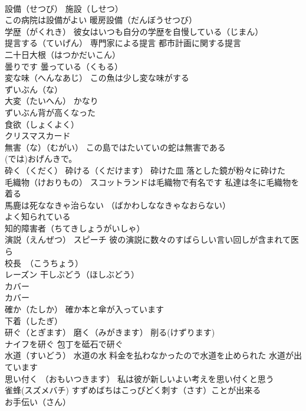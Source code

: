 \documentclass[8pt]{extreport}
\begin{document}
\begin{CJK}{UTF8}{min}
\\	設備（せつび） 施設（しせつ）
\\	この病院は設備がよい 暖房設備（だんぼうせつび）
\\	学歴（がくれき） 彼女はいつも自分の学歴を自慢している（じまん）
\\	提言する（ていげん） 専門家による提言 都市計画に関する提言
\\	二十日大根（はつかだいこん）
\\	曇りです 曇っている（くもる）
\\	変な味（へんなあじ） この魚は少し変な味がする
\\	ずいぶん（な）
\\	大変（たいへん） かなり 
\\	ずいぶん背が高くなった
\\	食欲（しょくよく）
\\	クリスマスカード
\\	無害（な）（むがい） この島ではたいていの蛇は無害である
\\	(では)おげんきで。
\\	砕く（くだく） 砕ける（くだけます） 砕けた皿 落とした鏡が粉々に砕けた
\\	毛織物（けおりもの） スコットランドは毛織物で有名です 私達は冬に毛織物を着る
\\	馬鹿は死ななきゃ治らない （ばかわしななきゃなおらない）
\\	よく知られている
\\	知的障害者（ちてきしょうがいしゃ）
\\	演説（えんぜつ） スピーチ 彼の演説に数々のすばらしい言い回しが含まれて医ら
\\	校長　（こうちょう）
\\	レーズン 干しぶどう（ほしぶどう）
\\	カバー 
\\	カバー
\\	確か（たしか） 確か本と傘が入っています
\\	下着（したぎ）
\\	研ぐ（とぎます） 磨く（みがきます） 削る(けずります) 
\\	ナイフを研ぐ 包丁を砥石で研ぐ
\\	水道（すいどう） 水道の水 料金を払わなかったので水道を止められた 水道が出ています
\\	思い付く （おもいつきます） 私は彼が新しいよい考えを思い付くと思う
\\	雀蜂(スズメバチ) すずめばちはこっぴどく刺す（さす）ことが出来る
\\	お手伝い（さん）

\end{CJK}
\end{document}
